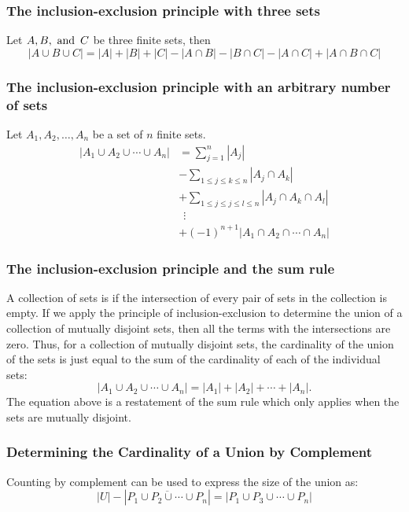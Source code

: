 \subsubsection*{The inclusion-exclusion principle with three sets}
Let $A, B, \operatorname{~\text{and}~} C$ be three finite sets, then
\[
  |A \cup B \cup C| = |A| + |B| + |C| - |A \cap B| - |B \cap C| - |A \cap C| + |A \cap B \cap C|
\]

\subsubsection*{The inclusion-exclusion principle with an arbitrary number of sets}
Let $A_1,A_2,\ldots,A_n$ be a set of $n$ finite sets.
\begin{align*}
  |A_1 \cup A_2 \cup \cdots \cup A_n| & = \sum_{j=1}^{n} |A_j|                                         \\
                                      & - \sum_{1 \leq j \leq k \leq n} |A_j \cap A_k|                 \\
                                      & + \sum_{1 \leq j \leq j \leq l \leq n} |A_j \cap A_k \cap A_l| \\
                                      & ~~\vdots                                                       \\
                                      & + (-1)^{n+1} |A_1 \cap A_2 \cap \cdots \cap A_n|
\end{align*}

\subsubsection*{The inclusion-exclusion principle and the sum rule}
A collection of sets is  if the intersection of every pair of sets in the collection is empty. If we apply the principle of inclusion-exclusion to determine the union of a collection of mutually disjoint sets, then all the terms with the intersections are zero. Thus, for a collection of mutually disjoint sets, the cardinality of the union of the sets is just equal to the sum of the cardinality of each of the individual sets:
\[
  |A_1 \cup A_2 \cup \cdots \cup A_n| = |A_1| + |A_2| + \cdots + |A_n|.
\]
The equation above is a restatement of the sum rule which only applies when the sets are mutually disjoint.

\subsubsection*{Determining the Cardinality of a Union by Complement}
Counting by complement can be used to express the size of the union as:
\[
  |U| - |\overline{P_1 \cup P_2 \cup \cdots \cup P_n}| = |P_1 \cup P_3 \cup \cdots \cup P_n|
\]